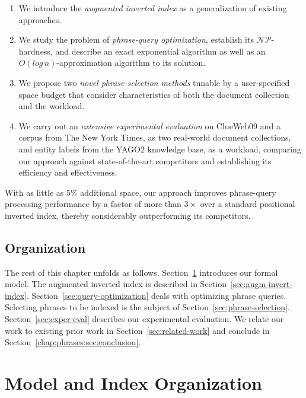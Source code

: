 \begin{enumerate}

\item We introduce the \emph{augmented inverted index} as a generalization of existing approaches.

\item We study the problem of \emph{phrase-query optimization},
  establish its $\mathcal{NP}$-hardness, and describe an exact
  exponential algorithm as well as an $O(log\,n)$-approximation
  algorithm to its solution.

\item We propose two \emph{novel phrase-selection methods} tunable by a
  user-specified space budget that consider characteristics of both
  the document collection and the workload.

\item We carry out an \emph{extensive experimental evaluation} on ClueWeb09 and a
  corpus from The New York Times, as two real-world document
  collections, and entity labels from the YAGO2 knowledge base, as a
  workload, comparing our approach against state-of-the-art
  competitors and establishing its efficiency and effectiveness.
\end{enumerate}

With as little as $5\%$ additional space, our approach improves
phrase-query processing performance by a factor of more than $3\times$
over a standard positional inverted index, thereby considerably
outperforming its competitors.

\subsection{Organization} 

The rest of this chapter unfolds as
follows. Section~\ref{sec:model} introduces our formal model. The
augmented inverted index is described in
Section~\ref{sec:augm-invert-index}. Section~\ref{sec:query-optimization}
deals with optimizing phrase queries. Selecting phrases to be indexed
is the subject of
Section~\ref{sec:phrase-selection}. Section~\ref{sec:exper-eval}
describes our experimental evaluation. We relate our work to existing
prior work in Section~\ref{sec:related-work} and conclude in
Section~\ref{chap:phrases:sec:conclusion}.


\section{Model and Index Organization}
\label{sec:model}

